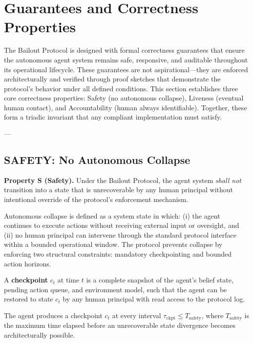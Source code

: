 \section{Guarantees and Correctness Properties}

The Bailout Protocol is designed with formal correctness guarantees that ensure the autonomous agent system remains safe, responsive, and auditable throughout its operational lifecycle. These guarantees are not aspirational—they are enforced architecturally and verified through proof sketches that demonstrate the protocol's behavior under all defined conditions. This section establishes three core correctness properties: Safety (no autonomous collapse), Liveness (eventual human contact), and Accountability (human always identifiable). Together, these form a triadic invariant that any compliant implementation must satisfy.

---

\subsection{SAFETY: No Autonomous Collapse}

\textbf{Property S (Safety).} Under the Bailout Protocol, the agent system \emph{shall not} transition into a state that is unrecoverable by any human principal without intentional override of the protocol's enforcement mechanism.

Autonomous collapse is defined as a system state in which: (i) the agent continues to execute actions without receiving external input or oversight, and (ii) no human principal can intervene through the standard protocol interface within a bounded operational window. The protocol prevents collapse by enforcing two structural constraints: mandatory checkpointing and bounded action horizons.

\begin{definition}
A \textbf{checkpoint} $c_t$ at time $t$ is a complete snapshot of the agent's belief state, pending action queue, and environment model, such that the agent can be restored to state $c_t$ by any human principal with read access to the protocol log.
\end{definition}

\begin{invariant}
The agent produces a checkpoint $c_t$ at every interval $\tau_{\text{ckpt}} \leq T_{\text{safety}}$, where $T_{\text{safety}}$ is the maximum time elapsed before an unrecoverable state divergence becomes architecturally possible.
\end{invariant}

